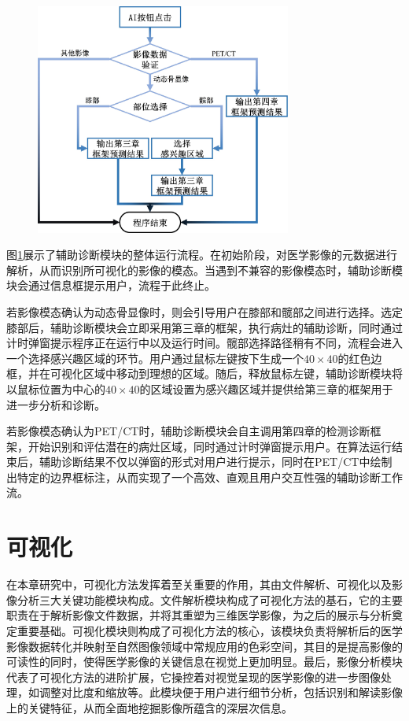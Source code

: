 \begin{figure}[htbp]
  \centering
  \includegraphics[width=0.75\textwidth]{figures/chap05_diagnose.jpg}
  \label{fig:chap05_diagnose}
\end{figure}

图\ref{fig:chap05_diagnose}展示了辅助诊断模块的整体运行流程。在初始阶段，对医学影像的元数据进行解析，从而识别所可视化的影像的模态。当遇到不兼容的影像模态时，辅助诊断模块会通过信息框提示用户，流程于此终止。

若影像模态确认为动态骨显像时，则会引导用户在膝部和髋部之间进行选择。选定膝部后，辅助诊断模块会立即采用第三章的框架，执行病灶的辅助诊断，同时通过计时弹窗提示程序正在运行中以及运行时间。髋部选择路径稍有不同，流程会进入一个选择感兴趣区域的环节。用户通过鼠标左键按下生成一个\(40 \times 40\)的红色边框，并在可视化区域中移动到理想的区域。随后，释放鼠标左键，辅助诊断模块将以鼠标位置为中心的\(40 \times40 \)的区域设置为感兴趣区域并提供给第三章的框架用于进一步分析和诊断。

若影像模态确认为PET/CT时，辅助诊断模块会自主调用第四章的检测诊断框架，开始识别和评估潜在的病灶区域，同时通过计时弹窗提示用户。在算法运行结束后，辅助诊断结果不仅以弹窗的形式对用户进行提示，同时在PET/CT中绘制出特定的边界框标注，从而实现了一个高效、直观且用户交互性强的辅助诊断工作流。

\section{可视化}

在本章研究中，可视化方法发挥着至关重要的作用，其由文件解析、可视化以及影像分析三大关键功能模块构成。文件解析模块构成了可视化方法的基石，它的主要职责在于解析影像文件数据，并将其重塑为三维医学影像，为之后的展示与分析奠定重要基础。可视化模块则构成了可视化方法的核心，该模块负责将解析后的医学影像数据转化并映射至自然图像领域中常规应用的色彩空间，其目的是提高影像的可读性的同时，使得医学影像的关键信息在视觉上更加明显。最后，影像分析模块代表了可视化方法的进阶扩展，它操控着对视觉呈现的医学影像的进一步图像处理，如调整对比度和缩放等。此模块便于用户进行细节分析，包括识别和解读影像上的关键特征，从而全面地挖掘影像所蕴含的深层次信息。

